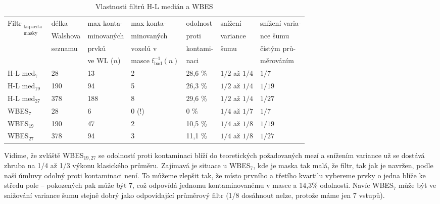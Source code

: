 \begin{table}[h]
    \hspace{-0.6cm}
    \begin{tabular}{lllllll}
      \toprule
      \multirow{4}{*}{Filtr$_{\mathrm{\substack{kapacita\\ masky}}}$} &délka&max konta-& max konta- & odolnost    & snížení    & snížení varia- \\
                                        &Walshova& minovaných & minovaných & proti       & variance   & nce šumu      \\
                                        &seznamu& prvků       & voxelů v   & kontami-    & šumu       & čistým prů-     \\
                                        &       & ve WL ($n$) & masce $\mathrm{f_{bad}^{-1}}(n)$ & naci &  & měrováním  \\
      \midrule
      H-L med$_{\mathrm{7}}$            & 28  & 13  & 2                 & 28,6 \%       & $1/2$ až $1/4$    & $1/7$ \\
      H-L med$_{\mathrm{19}}$           & 190 & 94  & 5                 & 26,3 \%       & $1/2$ až $1/4$    & $1/19$ \\
      H-L med$_{\mathrm{27}}$           & 378 & 188 & 8                 & 29,6 \%       & $1/2$ až $1/4$    & $1/27$  \\
      WBES$_{\mathrm{7}}$               & 28  & 6   & 0 (!)             & 0 \%          & $1/4$ až $1/7$    & $1/7$ \\
      WBES$_{\mathrm{19}}$              & 190 & 47  & 2                 & 10,5 \%       & $1/4$ až $1/8$    & $1/19$ \\
      WBES$_{\mathrm{27}}$              & 378 & 94  & 3                 & 11,1 \%       & $1/4$ až $1/8$    & $1/27$ \\
      \bottomrule
    \end{tabular}
    \caption{Vlastnosti filtrů H-L medián a WBES}
\end{table}\label{tab WBES}

     Vidíme, že zvláště WBES$_{\mathrm{19,27}}$ se odolností proti kontaminaci blíží do teoretických požadovaných mezí a snížením variance už se dostává zhruba na 1/4 až 1/3 výkonu klasického průměru. Zajímavá je situace u WBES$_{\mathrm{7}}$, kde je maska tak malá, že filtr, tak jak je navržen, podle naší úmluvy odolný proti kontaminaci není. To můžeme zlepšit tak, že místo prvního a třetího kvartilu vybereme prvky o jedna blíže ke středu pole -- pokozených pak může být 7, což odpovídá jednomu kontaminovanému v masce a 14,3\% odolnosti. Navíc WBES$_{\mathrm{7}}$ může být ve snižování variance šumu stejně dobrý jako odpovídající průměrový filtr (1/8 dosáhnout nelze, protože máme jen 7 vstupů).
     
